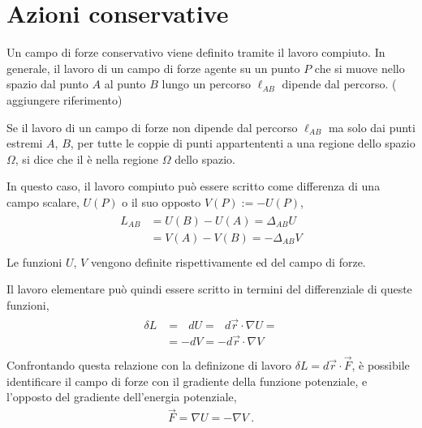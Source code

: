 \documentclass[letterpaper,10pt,italian]{jupyterBook}
\begin{document}
\section{Azioni conservative}
\label{\detokenize{ch/mechanics/actions-conservative:azioni-conservative}}\label{\detokenize{ch/mechanics/actions-conservative:physics-hs-mechanics-actions-conservative}}\label{\detokenize{ch/mechanics/actions-conservative::doc}}
\sphinxAtStartPar
Un campo di forze conservativo viene definito tramite il lavoro compiuto. In generale, il lavoro di un campo di forze agente su un punto \(P\) che si muove nello spazio dal punto \(A\) al punto \(B\) lungo un percorso \(\ell_{AB}\) dipende dal percorso. ( aggiungere riferimento)

\sphinxAtStartPar
Se il lavoro di un campo di forze non dipende dal percorso \(\ell_{AB}\) ma solo dai punti estremi \(A\), \(B\), per tutte le coppie di punti appartententi a una regione dello spazio \(\Omega\), si dice che il  è  nella regione \(\Omega\) dello spazio.

\sphinxAtStartPar
In questo caso, il lavoro compiuto può essere scritto come differenza di una campo scalare, \(U(P)\) o il suo opposto \(V(P) := - U(P)\),
\begin{equation*}
\begin{split}\begin{aligned}
  L_{AB} &  = U(B) - U(A) = \Delta_{AB} U  \\
         &  = V(A) - V(B) =-\Delta_{AB} V  \\
\end{aligned}\end{split}
\end{equation*}
\sphinxAtStartPar
Le funzioni \(U\), \(V\) vengono definite rispettivamente  ed  del campo di forze.

\sphinxAtStartPar
Il lavoro elementare può quindi essere scritto in termini del differenziale di queste funzioni,
\begin{equation*}
\begin{split}\begin{aligned}
  \delta L & = \ \ \ d U =\ \ \ d \vec{r} \cdot \nabla U  = \\
           & =     - d V =    - d \vec{r} \cdot \nabla V \\
\end{aligned}\end{split}
\end{equation*}
\sphinxAtStartPar
Confrontando questa relazione con la definizone di lavoro \(\delta L = d \vec{r} \cdot \vec{F}\), è possibile identificare il campo di forze con il gradiente della funzione potenziale, e l’opposto del gradiente dell’energia potenziale,
\begin{equation*}
\begin{split}\vec{F} = \nabla U = - \nabla V \ .\end{split}
\end{equation*}
\sphinxstepscope
\end{document}
